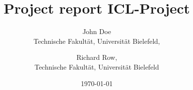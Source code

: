 \documentclass[a4paper,fontsize=10pt,dvipsnames]{scrreprt}
\begin{document}
\title{Project report ICL-Project}
\date{\today}
\author{John Doe\\ Technische Fakult\"at, Universit\"at Bielefeld,
        \and Richard Row, \\ Technische Fakult\"at, Universit\"at Bielefeld}
\maketitle

\setcounter{page}{0}
\thispagestyle{empty}
\tableofcontents
\clearpage

\listoftodos
\clearpage

\setcounter{page}{0}



\newpage
{}
{}


\newpage
\appendix

\end{document}
